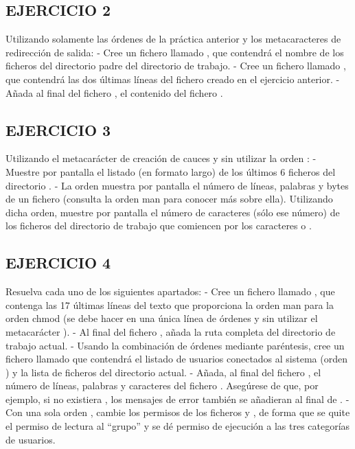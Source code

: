 \subsection{EJERCICIO 2}

Utilizando solamente las órdenes de la práctica anterior y los metacaracteres de redirección de salida:
- Cree un fichero llamado , que contendrá el nombre de los ficheros del directorio padre del directorio de trabajo.
- Cree un fichero llamado , que contendrá las dos últimas líneas del fichero creado en el ejercicio anterior.
- Añada al final del fichero , el contenido del fichero .

\subsection{EJERCICIO 3}

Utilizando el metacarácter de creación de cauces y sin utilizar la orden :
- Muestre por pantalla el listado (en formato largo) de los últimos 6 ficheros del directorio .
- La orden muestra por pantalla el número de líneas, palabras y bytes de un fichero (consulta la orden man para conocer más sobre ella). Utilizando dicha orden, muestre por pantalla el número de caracteres (sólo ese número) de los ficheros del directorio de trabajo que comiencen por los caracteres  o .

\subsection{EJERCICIO 4}

Resuelva cada uno de los siguientes apartados:
- Cree un fichero llamado , que contenga las 17 últimas líneas del texto que proporciona la orden man para la orden chmod (se debe hacer en una única línea de órdenes y sin utilizar el metacarácter \code{;} ).
- Al final del fichero , añada la ruta completa del directorio de trabajo actual.
- Usando la combinación de órdenes mediante paréntesis, cree un fichero llamado  que contendrá el listado de usuarios conectados al sistema (orden ) y la lista de ficheros del directorio actual.
- Añada, al final del fichero , el número de líneas, palabras y caracteres del fichero . Asegúrese de que, por ejemplo, si no existiera , los mensajes de error también se añadieran al final de .
- Con una sola orden , cambie los permisos de los ficheros  y , de forma que se quite el permiso de lectura al “grupo” y se dé permiso de ejecución a las tres categorías de usuarios.

